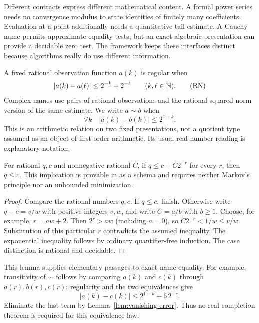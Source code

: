Different contracts express different mathematical content. A formal
power series needs no convergence modulus to state identities of finitely
many coefficients. Evaluation at a point additionally needs a quantitative
tail estimate. A Cauchy name permits approximate equality tests, but an
exact algebraic presentation can provide a decidable zero test. The
framework keeps these interfaces distinct because algorithms really do
use different information.

\begin{definition}
A fixed rational observation function $a(k)$ is regular when
\begin{equation}
 |a(k)-a(\ell)|\le 2^{-k}+2^{-\ell}
 \qquad(k,\ell\in\mathbb N).                         \tag{RN}\label{eq:RN}
\end{equation}
Complex names use pairs of rational observations and the rational
squared-norm version of the same estimate. We write $a\sim b$ when
\[
 \forall k\quad |a(k)-b(k)|\le 2^{1-k}.
\]
This is an arithmetic relation on two fixed presentations, not a
quotient type assumed as an object of first-order arithmetic. Its
usual real-number reading is explanatory notation.
\end{definition}

\begin{lemma}
\label{lem:vanishing-error}
For rational $q,c$ and nonnegative rational $C$, if
$q\le c+C2^{-r}$ for every $r$, then $q\le c$.
This implication is provable in \iPRA{} as a schema and requires neither
Markov's principle nor an unbounded minimization.
\end{lemma}
\begin{proof}
Compare the rational numbers $q,c$. If $q\le c$, finish. Otherwise write
$q-c=v/w$ with positive integers $v,w$, and write $C=a/b$ with $b\ge1$.
Choose, for example, $r=aw+2$. Then $2^r>aw$ (including $a=0$), so
$C2^{-r}<1/w\le v/w$. Substitution of this particular $r$ contradicts
the assumed inequality. The exponential inequality follows by ordinary
quantifier-free induction. The case distinction is rational and decidable.
\end{proof}

This lemma supplies elementary passages to exact name equality. For
example, transitivity of $\sim$ follows by comparing $a(k)$ and $c(k)$
through $a(r),b(r),c(r)$: regularity and the two equivalences give
\[
 |a(k)-c(k)|\le 2^{1-k}+6\,2^{-r}.
\]
Eliminate the last term by Lemma~\ref{lem:vanishing-error}. Thus no real
completion theorem is required for this equivalence law.

